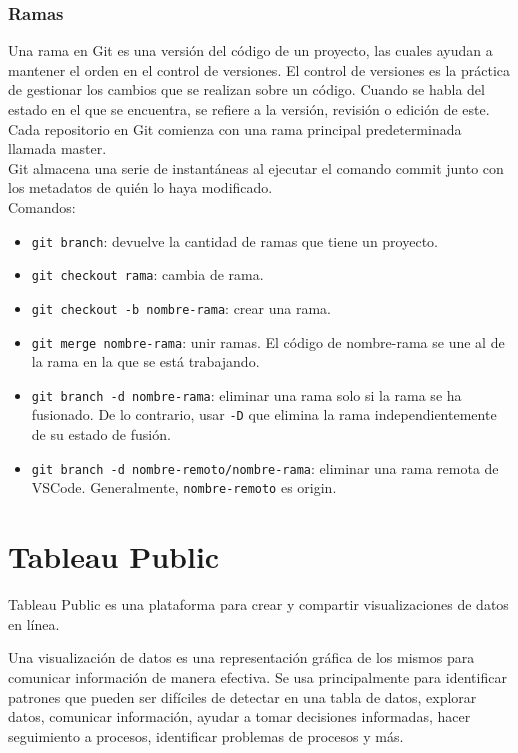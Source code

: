 \documentclass[a4paper, 12pt]{book}
\begin{document}
\subsection{Ramas}
Una rama en Git es una versión del código de un proyecto, las cuales ayudan a mantener el orden en el control de versiones. El control de versiones es la práctica de gestionar los cambios que se realizan sobre un código. Cuando se habla del estado en el que se encuentra, se refiere a la versión, revisión o edición de este. \\
Cada repositorio en Git comienza con una rama principal predeterminada llamada master. \\
Git almacena una serie de instantáneas al ejecutar el comando commit junto con los metadatos de quién lo haya modificado. \\
Comandos:
\begin{itemize}
\item \texttt{git branch}: devuelve la cantidad de ramas que tiene un proyecto.
\item \texttt{git checkout rama}: cambia de rama.
\item \texttt{git checkout -b nombre-rama}: crear una rama.
\item \texttt{git merge nombre-rama}: unir ramas. El código de nombre-rama se une al de la rama en la que se está trabajando.
\item \texttt{git branch -d nombre-rama}: eliminar una rama solo si la rama se ha fusionado. De lo contrario, usar \texttt{-D} que elimina la rama independientemente de su estado de fusión.
\item \texttt{git branch -d nombre-remoto/nombre-rama}: eliminar una rama remota de VSCode. Generalmente, \texttt{nombre-remoto} es origin.
\end{itemize}

%
\chapter{Tableau Public}
Tableau Public es una plataforma para crear y compartir visualizaciones de datos en línea.

Una visualización de datos es una representación gráfica de los mismos para comunicar información de manera efectiva. Se usa principalmente para identificar patrones que pueden ser difíciles de detectar en una tabla de datos, explorar datos, comunicar información, ayudar a tomar decisiones informadas, hacer seguimiento a procesos, identificar problemas de procesos y más.
\end{document}

